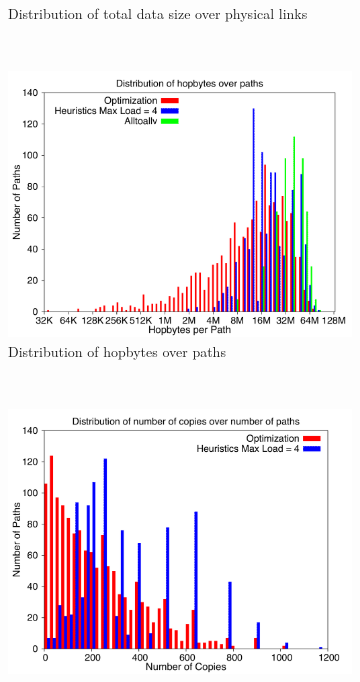 \begin{figure}[!htbp]
\begin{subfigure}[b]{0.49\textwidth}
                \caption{Distribution of total data size over physical links}
                \label{fig:87_1024_loaddata}
        \end{subfigure}
        ~ %
        \begin{subfigure}[b]{0.49\textwidth}
                \includegraphics[width=\textwidth]{report_figures/constantr/87_1024/hopbyte_histo.pdf}
                \caption{Distribution of hopbytes over paths}
                \label{fig:87_1024_hopbyte}
        \end{subfigure}
        ~ %
        \begin{subfigure}[b]{0.49\textwidth}
                \includegraphics[width=\textwidth]{report_figures/constantr/87_1024/hopcopy_histo.pdf}

\end{subfigure}
\end{figure}
